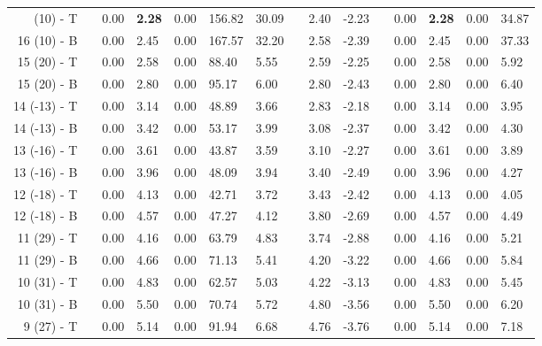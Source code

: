 \begin{table}[H]
\begin{longtable}{@{}rllllllllllllll@{}}
\bottomrule
\endlastfoot
  16 (10) - T &&    0.00 &    \textbf{\large 2.28} &    0.00 &  156.82 & 30.09 && 2.40 & -2.23 &&     0.00 &     \textbf{\large 2.28} &     0.00 &    34.87 \\
  16 (10) - B &&    0.00 &    2.45 &    0.00 &  167.57 & 32.20 && 2.58 & -2.39 &&     0.00 &     2.45 &     0.00 &    37.33 \\\midrule
  15 (20) - T &&    0.00 &    2.58 &    0.00 &   88.40 &  5.55 && 2.59 & -2.25 &&     0.00 &     2.58 &     0.00 &     5.92 \\
  15 (20) - B &&    0.00 &    2.80 &    0.00 &   95.17 &  6.00 && 2.80 & -2.43 &&     0.00 &     2.80 &     0.00 &     6.40 \\\midrule
 14 (-13) - T &&    0.00 &    3.14 &    0.00 &   48.89 &  3.66 && 2.83 & -2.18 &&     0.00 &     3.14 &     0.00 &     3.95 \\
 14 (-13) - B &&    0.00 &    3.42 &    0.00 &   53.17 &  3.99 && 3.08 & -2.37 &&     0.00 &     3.42 &     0.00 &     4.30 \\\midrule
 13 (-16) - T &&    0.00 &    3.61 &    0.00 &   43.87 &  3.59 && 3.10 & -2.27 &&     0.00 &     3.61 &     0.00 &     3.89 \\
 13 (-16) - B &&    0.00 &    3.96 &    0.00 &   48.09 &  3.94 && 3.40 & -2.49 &&     0.00 &     3.96 &     0.00 &     4.27 \\\midrule
 12 (-18) - T &&    0.00 &    4.13 &    0.00 &   42.71 &  3.72 && 3.43 & -2.42 &&     0.00 &     4.13 &     0.00 &     4.05 \\
 12 (-18) - B &&    0.00 &    4.57 &    0.00 &   47.27 &  4.12 && 3.80 & -2.69 &&     0.00 &     4.57 &     0.00 &     4.49 \\\midrule
  11 (29) - T &&    0.00 &    4.16 &    0.00 &   63.79 &  4.83 && 3.74 & -2.88 &&     0.00 &     4.16 &     0.00 &     5.21 \\
  11 (29) - B &&    0.00 &    4.66 &    0.00 &   71.13 &  5.41 && 4.20 & -3.22 &&     0.00 &     4.66 &     0.00 &     5.84 \\\midrule
  10 (31) - T &&    0.00 &    4.83 &    0.00 &   62.57 &  5.03 && 4.22 & -3.13 &&     0.00 &     4.83 &     0.00 &     5.45 \\
  10 (31) - B &&    0.00 &    5.50 &    0.00 &   70.74 &  5.72 && 4.80 & -3.56 &&     0.00 &     5.50 &     0.00 &     6.20 \\\midrule
   9 (27) - T &&    0.00 &    5.14 &    0.00 &   91.94 &  6.68 && 4.76 & -3.76 &&     0.00 &     5.14 &     0.00 &     7.18 \\

\end{longtable}
\end{table}
